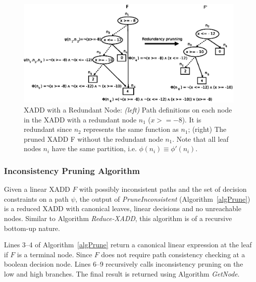 \documentclass[twoside,11pt]{article}
\begin{document}
\begin{figure}[t!]
\centering
\includegraphics[width=1\textwidth]{FiguresSource/redundancyPrunning.eps}
\vspace{-2mm}
\caption{%
XADD with a Redundant Node:  {\it (left)} Path definitions on each node in the XADD with a redundant node $n_1$  ($x>=-8$). It is redundant since $n_2$ represents the same function as $n_1$; (right) The pruned XADD F without the redundant node $n_1$. Note that all leaf nodes $n_i$ have the same partition, i.e. $\phi(n_i) \equiv \phi'(n_i)$.}
\label{fig:redundant_graph}
\end{figure}


\subsubsection{Inconsistency Pruning Algorithm}

Given a linear XADD $F$ with possibly inconsistent paths and the set of decision constraints on a path $\psi$, the output of \emph{PruneInconsistent} (Algorithm~\ref{algPrune}) is a reduced XADD with canonical leaves, linear decisions and no unreachable nodes. Similar to Algorithm \emph{Reduce-XADD}, this algorithm is of a recursive bottom-up nature. 

Lines 3--4 of Algorithm~\ref{algPrune} return a canonical linear expression at the leaf if $F$ is a terminal node. Since $F$ does not require path consistency checking at a boolean decision node. Lines 6--9 recursively calls inconsistency pruning on the low and high branches. The final result is returned using Algorithm \emph{GetNode}.
\end{document}
